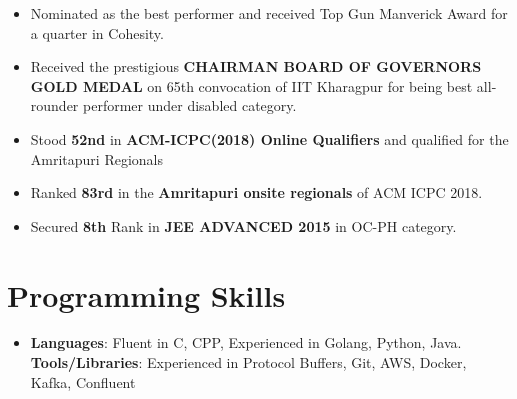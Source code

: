 \documentclass[letterpaper,11pt]{article}
\newcommand{\customresumeItem}[1]{
  \item\small{
    #1
  }
}
\newcommand{\resumeSubHeadingListStart}{\begin{itemize}[itemsep=0.01pt, leftmargin=*]}
\newcommand{\resumeSubHeadingListEnd}{\end{itemize} \vspace{-8pt}}
\newcommand{\resumeItemListStart}{\begin{itemize}[itemsep=0.01pt]}
\newcommand{\resumeItemListEnd}{\end{itemize}  \vspace{-8pt}}
\begin{document}
   \resumeItemListStart
   \customresumeItem
   {Nominated as the best performer and received Top Gun Manverick Award for a quarter in Cohesity.}
   \customresumeItem
   {Received the prestigious \textbf{CHAIRMAN BOARD OF GOVERNORS GOLD MEDAL} on 65th convocation of IIT Kharagpur for being best all-rounder performer under disabled category.}
   \customresumeItem
   {Stood \textbf{52nd} in \textbf{ACM-ICPC(2018) Online Qualifiers} and qualified for the Amritapuri Regionals}
   \customresumeItem
   {Ranked \textbf{83rd} in the \textbf{Amritapuri onsite regionals} of ACM ICPC 2018.}
   \customresumeItem
   {Secured \textbf{8th} Rank in \textbf{JEE ADVANCED 2015} in OC-PH category.}
   \resumeItemListEnd
%
\section{Programming Skills}
 \resumeSubHeadingListStart
   \item[]{
     \textbf{Languages}{: Fluent in C, CPP, Experienced in Golang, Python, Java.} \\
     \textbf{Tools/Libraries}{: Experienced in Protocol Buffers, Git, AWS, Docker, Kafka, Confluent}
   }
 \resumeSubHeadingListEnd


\end{document}
